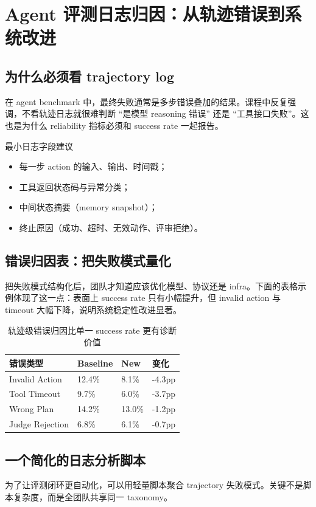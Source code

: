 \section{Agent 评测日志归因：从轨迹错误到系统改进}

\subsection{为什么必须看 trajectory log}
在 agent benchmark 中，最终失败通常是多步错误叠加的结果。课程中反复强调，不看轨迹日志就很难判断 ``是模型 reasoning 错误'' 还是 ``工具接口失败''。这也是为什么 reliability 指标必须和 success rate 一起报告。

\begin{knowledgebox}{最小日志字段建议}
\begin{itemize}
    \item 每一步 action 的输入、输出、时间戳；
    \item 工具返回状态码与异常分类；
    \item 中间状态摘要（memory snapshot）；
    \item 终止原因（成功、超时、无效动作、评审拒绝）。
\end{itemize}
\end{knowledgebox}

\subsection{错误归因表：把失败模式量化}
把失败模式结构化后，团队才知道应该优化模型、协议还是 infra。下面的表格示例体现了这一点：表面上 success rate 只有小幅提升，但 invalid action 与 timeout 大幅下降，说明系统稳定性改进显著。

\begin{table}[H]
\centering
\begin{tabular}{p{3.0cm}p{2.5cm}p{2.5cm}p{2.5cm}}
\toprule
\textbf{错误类型} & \textbf{Baseline} & \textbf{New} & \textbf{变化} \\
\midrule
Invalid Action & 12.4\% & 8.1\% & -4.3pp \\
Tool Timeout & 9.7\% & 6.0\% & -3.7pp \\
Wrong Plan & 14.2\% & 13.0\% & -1.2pp \\
Judge Rejection & 6.8\% & 6.1\% & -0.7pp \\
\bottomrule
\end{tabular}
\caption{轨迹级错误归因比单一 success rate 更有诊断价值}
\end{table}

\subsection{一个简化的日志分析脚本}
为了让评测闭环更自动化，可以用轻量脚本聚合 trajectory 失败模式。关键不是脚本复杂度，而是全团队共享同一 taxonomy。

